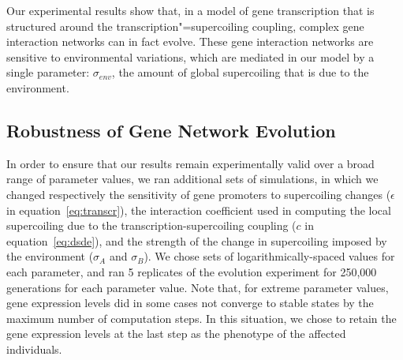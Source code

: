 Our experimental results show that, in a model of gene transcription that is structured around the transcription"=supercoiling coupling, complex gene interaction networks can in fact evolve.
These gene interaction networks are sensitive to environmental variations, which are mediated in our model by a single parameter: $\sigma_{env}$, the amount of global supercoiling that is due to the environment.

\subsection{Robustness of Gene Network Evolution}
\label{sec:alife:param_explor}

In order to ensure that our results remain experimentally valid over a broad range of parameter values, we ran additional sets of simulations, in which we changed respectively the sensitivity of gene promoters to supercoiling changes ($\epsilon$ in equation~\ref{eq:transcr}), the interaction coefficient used in computing the local supercoiling due to the transcription-supercoiling coupling ($c$ in equation~\ref{eq:dsde}), and the strength of the change in supercoiling imposed by the environment ($\sigma_A$ and $\sigma_B$).
We chose sets of logarithmically-spaced values for each parameter, and ran 5 replicates of the evolution experiment for 250,000 generations for each parameter value.
Note that, for extreme parameter values, gene expression levels did in some cases not converge to stable states by the maximum number of computation steps.
In this situation, we chose to retain the gene expression levels at the last step as the phenotype of the affected individuals.

